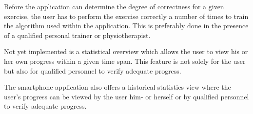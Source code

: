 Before the application can determine the degree of correctness for a given exercise, the user has to perform the exercise correctly a number of times to train the algorithm used within the application. This is preferably done in the presence of a qualified personal trainer or physiotherapist.

Not yet implemented is a statistical overview which allows the user to view his or her own progress within a given time span. This feature is not solely for the user but also for qualified personnel to verify adequate progress.

The smartphone application also offers a historical statistics view where the user's progress can be viewed by the user him- or herself or by qualified personnel to verify adequate progress.